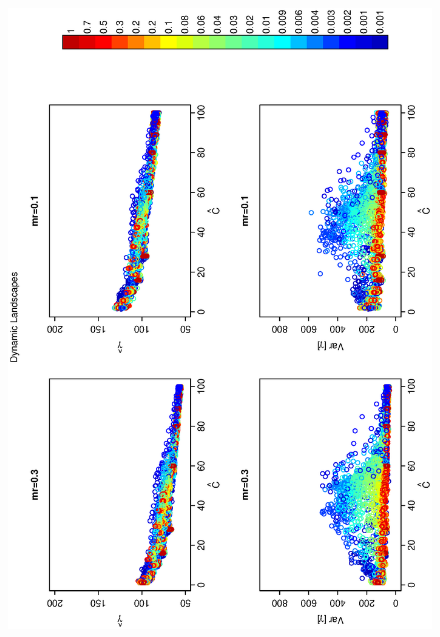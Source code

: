 \documentclass[12pt]{article}
\begin{document}
\begin{figure}[hb!]
\hspace{-0.5 in}\includegraphics[width=5in,angle=-90]{./figures/components_vs_gamma_3_2.eps}
\caption{}
\label{fig:SI-D2}
\end{figure}
\end{document}
